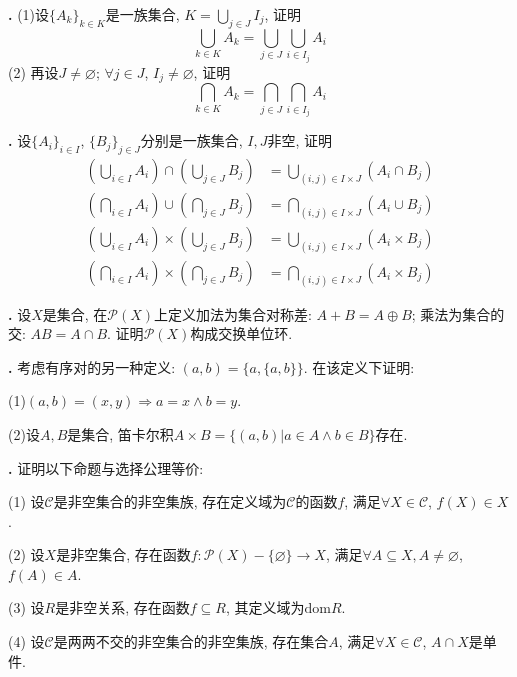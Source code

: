 \par \textbf{\theprobset .} \cite{NST} (1)设$\{A_k\}_{k\in K}$是一族集合, $K=\bigcup_{j\in J} I_j$, 证明
\begin{equation}
    \bigcup_{k\in K} A_k = \bigcup_{j\in J} \bigcup_{i\in I_j} A_i
\end{equation}
(2) 再设$J\neq \varnothing$; $\forall j\in J$, $I_j\neq \varnothing$, 证明
\begin{equation}
    \bigcap_{k\in K} A_k = \bigcap_{j\in J} \bigcap_{i\in I_j} A_i
\end{equation}

\par \textbf{\theprobset .} \cite{NST} 设$\{A_i\}_{i\in I}$, $\{B_j\}_{j\in J}$分别是一族集合, $I,J$非空, 证明
\begin{align}
    \left(\bigcup_{i\in I}A_i\right)\cap \left(\bigcup_{j\in J}B_j\right) &= \bigcup_{(i,j)\in I\times J} (A_i\cap B_j)\\
    \left(\bigcap_{i\in I}A_i\right)\cup \left(\bigcap_{j\in J}B_j\right) &= \bigcap_{(i,j)\in I\times J} (A_i\cup B_j)\\
    \left(\bigcup_{i\in I}A_i\right)\times \left(\bigcup_{j\in J}B_j\right) &= \bigcup_{(i,j)\in I\times J} (A_i\times B_j)\\
    \left(\bigcap_{i\in I}A_i\right)\times \left(\bigcap_{j\in J}B_j\right) &= \bigcap_{(i,j)\in I\times J} (A_i\times B_j)
\end{align}

\par \textbf{\theprobset .} \cite{CMM} 设$X$是集合, 在$\mathcal{P}(X)$上定义加法为集合对称差: $A+B=A\oplus B$; 乘法为集合的交: $AB=A\cap B$. 证明$\mathcal{P}(X)$构成交换单位环. 

\par \textbf{\theprobset .} \cite{AnT1} 考虑有序对的另一种定义: $(a,b)=\{a,\{a,b\}\}$. 在该定义下证明: 
\par (1)$(a,b)=(x,y)\Rightarrow a=x\land b=y$.
\par (2)设$A,B$是集合, 笛卡尔积$A\times B=\{(a,b)\vert a\in A\land b\in B\}$存在.

\par \textbf{\theprobset .} \cite{NST} 证明以下命题与选择公理等价:
\par (1) 设$\mathcal{C}$是非空集合的非空集族, 存在定义域为$\mathcal{C}$的函数$f$, 满足$\forall X\in \mathcal{C}$, $f(X)\in X$.
\par (2) 设$X$是非空集合, 存在函数$f:\mathcal{P}(X)-\{\varnothing\}\to X$, 满足$\forall A\subseteq X, A\neq \varnothing$, $f(A)\in A$. 
\par (3) 设$R$是非空关系, 存在函数$f\subseteq R$, 其定义域为$\text{dom} R$. 
\par (4) 设$\mathcal{C}$是两两不交的非空集合的非空集族, 存在集合$A$, 满足$\forall X\in \mathcal{C}$, $A\cap X$是单件. 

